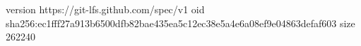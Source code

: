 version https://git-lfs.github.com/spec/v1
oid sha256:ec1fff27a913b6500dfb82bae435ea5c12ec38e5a4e6a08ef9e04863defaf603
size 262240
